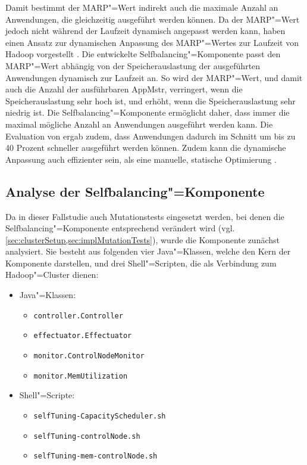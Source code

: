 Damit bestimmt der \gls{MARP}"=Wert indirekt auch die maximale Anzahl an Anwendungen, die gleichzeitig ausgeführt werden können.
Da der \gls{MARP}"=Wert jedoch nicht während der Laufzeit dynamisch angepasst werden kann, haben \citeauthor{Zhang2016} einen Ansatz zur dynamischen Anpassung des \gls{MARP}"=Wertes zur Laufzeit von Hadoop vorgestellt \cite{Zhang2016}.
Die entwickelte Selfbalancing"=Komponente passt den \gls{MARP}"=Wert abhängig von der Speicherauslastung der ausgeführten Anwendungen dynamisch zur Laufzeit an.
So wird der \gls{MARP}"=Wert, und damit auch die Anzahl der ausführbaren \gls{AppMstr}, verringert, wenn die Speicherauslastung sehr hoch ist, und erhöht, wenn die Speicherauslastung sehr niedrig ist.
Die Selfbalancing"=Komponente ermöglicht daher, dass immer die maximal mögliche Anzahl an Anwendungen ausgeführt werden kann.
Die Evaluation von \citeauthor{Zhang2016} ergab zudem, dass Anwendungen dadurch im Schnitt um bis zu 40 Prozent schneller ausgeführt werden können.
Zudem kann die dynamische Anpassung auch effizienter sein, als eine manuelle, statische Optimierung \cite{Zhang2016}.

\subsection{Analyse der Selfbalancing"=Komponente}
\label{subsec:selfbalancingAnalysis}

Da in dieser Fallstudie auch Mutationstests eingesetzt werden, bei denen die Selfbalancing"=Komponente entsprechend verändert wird (vgl. \cref{sec:clusterSetup,sec:implMutationTests}), wurde die Komponente zunächst analysiert.
Sie besteht aus folgenden vier Java"=Klassen, welche den Kern der Komponente darstellen, und drei Shell"=Scripten, die als Verbindung zum Hadoop"=Cluster dienen:

\begin{itemize}
    \item Java"=Klassen:
    \begin{itemize}
        \item \texttt{controller.Controller}
        \item \texttt{effectuator.Effectuator}
        \item \texttt{monitor.ControlNodeMonitor}
        \item \texttt{monitor.MemUtilization}
    \end{itemize}
    \item Shell"=Scripte:
    \begin{itemize}
        \item \texttt{selfTuning-CapacityScheduler.sh}
        \item \texttt{selfTuning-controlNode.sh}
        \item \texttt{selfTuning-mem-controlNode.sh}
    \end{itemize}
\end{itemize}

